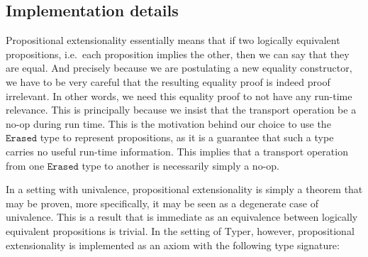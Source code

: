 \documentclass[12pt,twoside,maitrise]{dms}
\theoremstyle{definition}
\numberwithin{equation}{section}
\numberwithin{table}{chapter}
\numberwithin{figure}{chapter}
\newcommand\kw[1] {\textsf{#1}}
\newcommand\id[1] {\texttt{#1}}
\begin{document}

\subsection*{Implementation details}

Propositional extensionality essentially means that if two logically equivalent
propositions, i.e.\ each proposition implies the other, then we can say that
they are equal. And precisely because we are postulating a new equality
constructor, we have to be very careful that the resulting equality proof is
indeed proof irrelevant. In other words, we need this equality proof to not have
any run-time relevance. This is principally because we insist that the transport
operation be a no-op during run time. This is the motivation behind our choice to
use the $\id{Erased}$ type to represent propositions, as it is a guarantee that
such a type carries no useful run-time information. This implies that a transport
operation from one $\id{Erased}$ type to another is necessarily simply a no-op.

In a setting with univalence, propositional extensionality is simply a theorem
that may be proven, more specifically, it may be seen as a degenerate case of univalence\cite{sozeau2013univalence}. This is a result that is
immediate as an equivalence between logically equivalent propositions is
trivial. In the setting of Typer, however, propositional extensionality is
implemented as an axiom with the following type signature:
\end{document}
